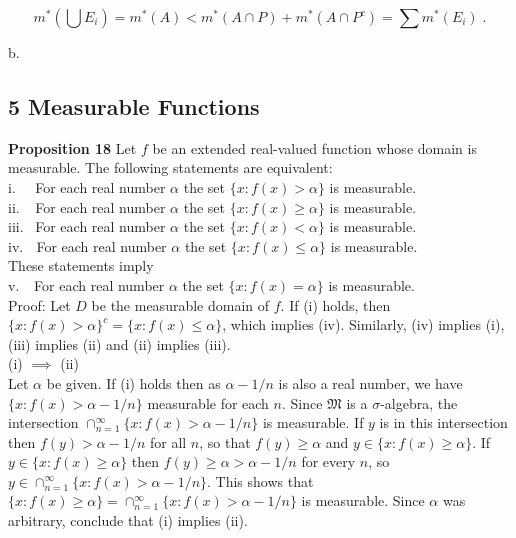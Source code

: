 \documentclass[a4paper]{article}
\begin{document}
$$m^*\left(\bigcup E_i\right) = m^*(A) < m^*(A \cap P) + m^*(A \cap P^c) = \sum m^*(E_i) \;.$$


b.\\

\subsection*{5 Measurable Functions}

{\bf Proposition 18} Let $f$ be an extended real-valued function whose domain is measurable. The following statements are equivalent:\\


i. $\; \; \,$ For each real number $\alpha$ the set $\{x : f(x) > \alpha \}$ is measurable.\\
ii. $\; \,$ For each real number $\alpha$ the set $\{x : f(x) \geq \alpha \}$ is measurable.\\
iii. $\,$ For each real number $\alpha$ the set $\{x : f(x) < \alpha \}$ is measurable.\\
iv. $\; $ For each real number $\alpha$ the set $\{x : f(x) \leq \alpha \}$ is measurable.\\
These statements imply\\
v. $\; \; \, $For each real number $\alpha$ the set $\{x : f(x) = \alpha\}$ is measurable. \\

Proof: Let $D$ be the measurable domain of $f$. If (i) holds, then $\{x : f(x) > \alpha \}^c = \{x : f(x) \leq \alpha\}$, which implies (iv). Similarly, (iv) implies (i), (iii) implies (ii) and (ii) implies (iii). \\

(i) $\implies$ (ii)\\
Let $\alpha$ be given. If (i) holds then as $\alpha - 1/n$ is also a real number, we have $\{x: f(x) > \alpha - 1/n \}$ measurable for each $n$. Since $\mathfrak{M}$ is a $\sigma$-algebra, the intersection $\cap_{n=1}^\infty \{x : f(x) > \alpha - 1/n\}$ is measurable. If $y$ is in this intersection then $f(y) > \alpha - 1/n$ for all $n$, so that $f(y) \geq \alpha$ and $y \in \{x: f(x) \geq \alpha\}$. If $y \in \{x : f(x) \geq \alpha\}$ then $f(y) \geq \alpha > \alpha - 1/n$ for every $n$, so $y \in \cap_{n=1}^\infty \{x: f(x) > \alpha - 1/n\}$. This shows that $\{x : f(x) \geq \alpha \} = \cap_{n=1}^\infty \{x : f(x) > \alpha - 1/n \}$ is measurable. Since $\alpha$ was arbitrary, conclude that (i) implies (ii).\\
\end{document}
